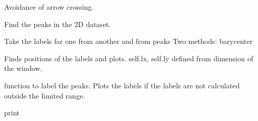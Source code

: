 \documentclass[letterpaper,10pt,openany,oneside]{sphinxmanual}
\begin{document}
\begin{fulllineitems}
\begin{fulllineitems}
\label{rst/visu2d:Visu.label_2D.PEAKPICK.decrossing}
Avoidance of arrow crossing.

\end{fulllineitems}


\begin{fulllineitems}
\label{rst/visu2d:Visu.label_2D.PEAKPICK.find_peaks}
Find the peaks in the 2D dataset.

\end{fulllineitems}


\begin{fulllineitems}
\label{rst/visu2d:Visu.label_2D.PEAKPICK.get_far}
Take the labels far one from another and from peaks
Two methods: barycenter

\end{fulllineitems}


\begin{fulllineitems}
\label{rst/visu2d:Visu.label_2D.PEAKPICK.make_labels}
Finds positions of the labels and plots.
self.lx, self.ly defined from dimension of the window.

\end{fulllineitems}


\begin{fulllineitems}
\label{rst/visu2d:Visu.label_2D.PEAKPICK.peaklabel}
function to label the peaks.
Plots the labels if the labels are not calculated outside the limited range.

\end{fulllineitems}


\begin{fulllineitems}
\label{rst/visu2d:Visu.label_2D.PEAKPICK.pr}
print


\end{fulllineitems}
\end{fulllineitems}
\end{document}
